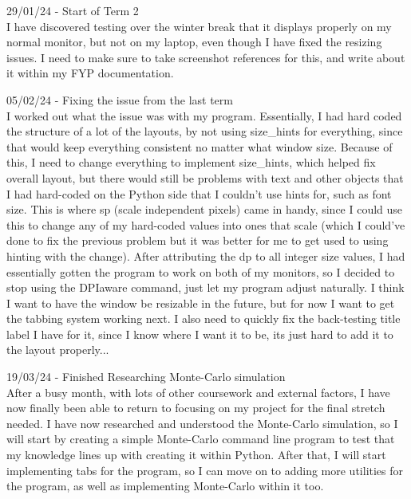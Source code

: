 \documentclass{article}
\begin{document}
29/01/24 - Start of Term 2\\
I have discovered testing over the winter break that it displays properly on my normal monitor, but not on my laptop, even though I have fixed the resizing issues. I need to make sure to take screenshot references for this, and write about it within my FYP documentation.\\\vspace{0.3cm}

05/02/24 - Fixing the issue from the last term\\
I worked out what the issue was with my program. Essentially, I had hard coded the structure of a lot of the layouts, by not using size\_hints for everything, since that would keep everything consistent no matter what window size. Because of this, I need to change everything to implement size\_hints, which helped fix overall layout, but there would still be problems with text and other objects that I had hard-coded on the Python side that I couldn't use hints for, such as font size. This is where sp (scale independent pixels) came in handy, since I could use this to change any of my hard-coded values into ones that scale (which I could've done to fix the previous problem but it was better for me to get used to using hinting with the change). After attributing the dp to all integer size values, I had essentially gotten the program to work on both of my monitors, so I decided to stop using the DPIaware command, just let my program adjust naturally. I think I want to have the window be resizable in the future, but for now I want to get the tabbing system working next. I also need to quickly fix the back-testing title label I have for it, since I know where I want it to be, its just hard to add it to the layout properly...\\\vspace{0.3cm}


19/03/24 - Finished Researching Monte-Carlo simulation\\
After a busy month, with lots of other coursework and external factors, I have now finally been able to return to focusing on my project for the final stretch needed. I have now researched and understood the Monte-Carlo simulation, so I will start by creating a simple Monte-Carlo command line program to test that my knowledge lines up with creating it within Python. After that, I will start implementing tabs for the program, so I can move on to adding more utilities for the program, as well as implementing Monte-Carlo within it too.\\\vspace{0.3cm}
\end{document}
